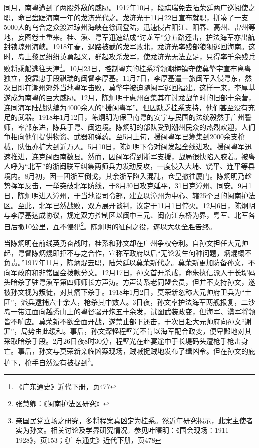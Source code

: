 同月，南粤遭到了两股外敌的威胁。1917年10月，段祺瑞免去陆荣廷两广巡阅使之职，命已盘踞海南一年的龙济光代之。龙济光于11月22日宣布就职，拼凑了一支5000人的乌合之众渡过琼州海峡在徐闻登陆，迅速侵占阳江、阳春、高州、雷州等地，妄图卷土重来。桂、滇、粤军迅速结成“讨龙军”分五路还击，护法海军亦出航封锁琼州海峡。1918年春，退路被截的龙军败北，龙济光率残部狼狈逃回海南。这时，岛上黎民纷纷英勇起义，群起攻杀龙军，使龙济光无法立足，只得率千余残兵败将乘船逃往天津\footnote{《广东通史》近代下册，页477}。10月23日，控制粤东的桂系将领潮梅镇守使莫擎宇宣布离粤独立，投靠忠于段祺瑞的闽督李厚基。11月7日，李厚基遣一旅闽军入侵粤东，然次日即在潮州郊外当地粤军击败，莫擎宇被迫随闽军逃回福建。这样一来，李厚基遂成为南粤的巨大威胁。12月，陈炯明于惠州召集其在讨龙战争时的旧部十余营，连同海军陆战队编为4000余人的“援闽粤军”。但因缺乏桂系支持，他们甚至没有充足的武器。1918年1月12日，陈炯明为保卫南粤的安宁与民国的法统毅然于广州誓师，率部东进，陈兵于粤、闽边境。陈炯明的部队受到潮州民众的热烈欢迎，人们争相向他们提供物资、武器和弹药。至5月上旬，援闽粤军已筹集到2000余支枪械，队伍亦扩大到近万人。5月10日，陈炯明下令对闽发起全线进攻。援闽粤军迅速推进，连克闽西南数县。然而，因闽军得到浙军支援，战局很快陷入胶着。被粤人呼为“北军”的浙闽联军纠集两师兵力发动反攻，一度侵入大埔、饶平、连平等县境内。8月初，因一团浙军倒戈，其余浙军陷入混乱，仓皇撤往厦门。陈炯明乃趁势挥军反击，一举突破北军防线，于8月30日攻克延平，31日克漳州、同安。9月1日，陈炯明进入漳州，于当地设司令部，建立以漳州为中心、辖25个县的闽南护法区。至此，北军已然战败，双方展开谈判，议定于11月1日停火。12月6日，陈炯明与李厚基达成协议，规定双方控制区以闽中三元、闽南江东桥为界，粤军、北军各自后撤10公里，互不侵犯\footnote{张慧卿：《闽南护法区研究》}。陈炯明的征闽之役，遂以大获全胜告终。

当陈炯明在前线英勇奋战时，桂系和孙文却在广州争权夺利。自孙文担任大元帅起，粤督陈炳焜即拒不与之合作，宣称军政府以后“无论发生何种问题，炳焜概不负责。”1917年11月，陈炳焜去职，陆荣廷以莫荣新代之。莫荣新更加防备孙文，不向军政府和非常国会拨款分文。12月17日，孙文首开杀戒，命朱执信派人于长堤码头暗杀了驻粤滇军第四师师长方声涛。方声涛系老同盟会员，但并不支持孙文，遂被孙文视为叛徒，对其痛下杀手。1918年1月2日，莫荣新忽称大元帅府卫兵为“土匪”，派兵逮捕六十余人，枪杀其中数人。3日夜，孙文率护法海军两舰报复，二沙岛一带江面向越秀山上的粤督署开炮五十余发，试图武装政变，但海军、滇军将领皆不响应。莫荣新不欲全面开战，遂禁止部下还击，于次日赴大元帅府向孙文“谢罪”，局势由此缓和。事后，孙文深怪程壁光不肯以海军配合政变，便卑鄙地对其采取暗杀手段。2月26日夜8时30分，程壁光在赴宴途中于长堤码头遭枪手枪击身亡。事后，孙文与莫荣新亲临凶案现场，贼喊捉贼地发布了缉凶令。但在孙文的庇护下，枪手自然没有被捉到\footnote{亲国民党立场之研究，多将程案真凶定为桂系。然近年研究揭示，此案主使者实为孙文。相关讨论及学界研究情况，参见叶曙明：《国会现场：1911—1928》，页153；《广东通史》近代下册，页478}。


